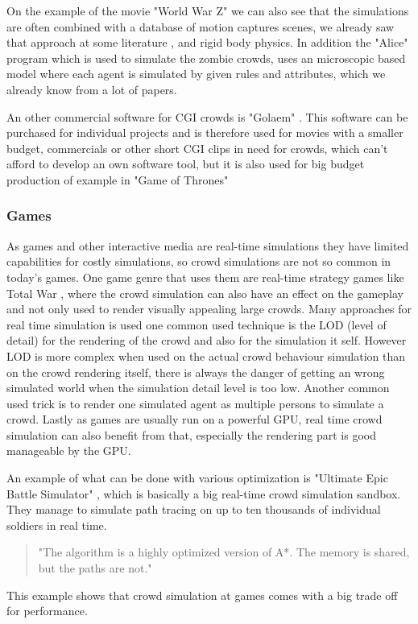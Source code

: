 \documentclass[sigconf]{acmart}
\begin{document}
On the example of the movie "World War Z" we can also see that the simulations are often combined with a database of motion captures scenes, we already saw that approach at some literature \cite{thalmann_crowd_2013}, and rigid body physics. In addition the "Alice" program which is used to simulate the zombie crowds, uses an microscopic based model where each agent is simulated by given rules and attributes, which we already know from a lot of papers. \cite{wired_worldwarz_doku} 

An other commercial software for CGI crowds is "Golaem" \cite{golaem_website}. This software can be purchased for individual projects and is therefore used for movies with a smaller budget, commercials or other short CGI clips in need for crowds, which can't afford to develop an own software tool, but it is also used for big budget production of example in "Game of Thrones" \cite{golaem_got_vid}

\cite{thalmann_crowd_2013}
\subsubsection{Games}

As games and other interactive media are real-time simulations they have limited capabilities for costly simulations, so crowd simulations are not so common in today's games. One game genre that uses them are real-time strategy games like Total War \cite{total_war_website}, where the crowd simulation can also have an effect on the gameplay and not only used to render visually appealing large crowds. 
Many approaches for real time simulation is used one common used technique is the LOD (level of detail) for the rendering of the crowd and also for the simulation it self. However LOD is more complex when used on the actual crowd behaviour simulation than on the crowd rendering itself, there is always the danger of getting an wrong simulated world when the simulation detail level is too low. Another common used trick is to render one simulated agent as multiple persons to simulate a crowd. Lastly as games are usually run on a powerful GPU, real time crowd simulation can also benefit from that, especially the rendering part is good manageable by the GPU. \cite{thalmann_crowd_2013}

An example of what can be done with various optimization is "Ultimate Epic Battle Simulator" \cite{ultimeEpicBattleSim_video} , which is basically a big real-time crowd simulation sandbox. They manage to simulate path tracing on up to ten thousands of individual soldiers in real time. 
\begin{quote}
"The algorithm is a highly optimized version of A*.  \label{term:A*Usage} The memory is shared, but the paths are not." \cite{ultimeEpicBattleSim_video}
\end{quote} This example shows that crowd simulation at games comes with a big trade off for performance. 
\end{document}
